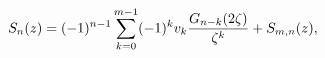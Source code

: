 \[S_{n}(z)=(-1)^{n-1}\sum_{k=0}^{m-1}(-1)^{k}v_{k}\frac{\mathop{G_{n-k}\/}%
\nolimits\!\left(2\zeta\right)}{\zeta^{k}}+S_{m,n}(z),\]